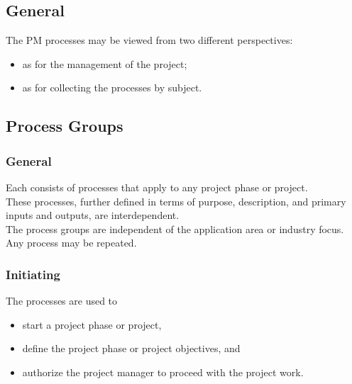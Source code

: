 \documentclass[letterpaper,10pt,english]{jupyterBook}
\begin{document}
\subsection{General}
\label{\detokenize{PM/pm-processes:general}}
\sphinxAtStartPar
The PM processes may be viewed from two different perspectives:
\begin{itemize}
\item {} 
\sphinxAtStartPar
as  for the management of the project;

\item {} 
\sphinxAtStartPar
as  for collecting the processes by subject.

\end{itemize}




\subsection{Process Groups}
\label{\detokenize{PM/pm-processes:process-groups}}

\subsubsection{General}
\label{\detokenize{PM/pm-processes:id1}}
\sphinxAtStartPar
Each  consists of processes that apply to any project phase or project. \\
These processes, further defined in terms of purpose, description, and primary inputs and outputs, are interdependent. \\
The process groups are independent of the application area or industry focus.
Any process may be repeated.


\subsubsection{Initiating}
\label{\detokenize{PM/pm-processes:initiating}}
\sphinxAtStartPar
The  processes are used to
\begin{itemize}
\item {} 
\sphinxAtStartPar
start a project phase or project,

\item {} 
\sphinxAtStartPar
define the project phase or project objectives, and

\item {} 
\sphinxAtStartPar
authorize the project manager to proceed with the project work.

\end{itemize}
\end{document}
